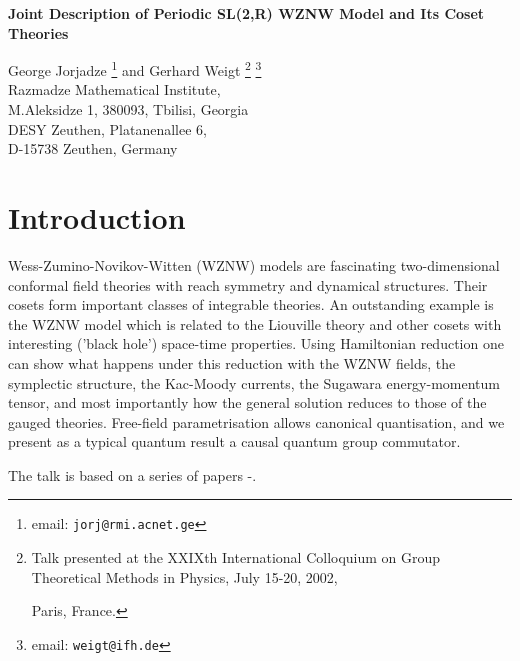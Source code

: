 \documentclass[a4paper,12]{article}
\renewcommand{\title}[1]{\begin{center}\bf\Large #1\end{center}}
\renewcommand{\author}[1]{\begin{center}\large #1\end{center}}
\begin{document}
\title{Joint Description of Periodic SL(2,R) WZNW Model and Its
  Coset Theories}

\author{
 George Jorjadze\coordHE{} 
\footnote{email: \tt jorj@rmi.acnet.ge}
 and Gerhard Weigt\myHighlight{${}^b$}\coordHE{}  
\footnote{Talk presented at the XXIXth International 
Colloquium on Group Theoretical Methods in Physics, July 15-20, 2002, 

\hspace{1.8mm}
Paris, France.}
\footnote{email: \tt weigt@ifh.de} \\
{\small\myHighlight{${}^a$}\coordHE{}Razmadze Mathematical Institute,}\\
  {\small M.Aleksidze 1, 380093, Tbilisi, Georgia}\\
{\small\myHighlight{${}^b$}\coordHE{}DESY Zeuthen, Platanenallee 6,}\\
{\small D-15738 Zeuthen, Germany}}

\begin{abstract}

\noindent
Liouville, \coordHE{} and \coordHE{}
coset structures are completely described by gauge invariant
Hamiltonian reduction of the  \coordHE{} WZNW theory.
\end{abstract}

\section{Introduction}

Wess-Zumino-Novikov-Witten (WZNW) models are fascinating
two-dimensional conformal field theories with reach symmetry and
dynamical structures. Their cosets form important classes of
integrable theories. An outstanding example is the \coordHE{} WZNW
model which is related to the Liouville theory and other cosets
with interesting ('black hole') space-time properties. Using
Hamiltonian reduction one can show what happens under this reduction
with the \coordHE{} WZNW fields, the symplectic structure, the
Kac-Moody currents, the Sugawara energy-momentum tensor, and most
importantly how the general \coordHE{} solution reduces to those of the
gauged theories. Free-field parametrisation allows canonical
quantisation, and we present as a typical quantum result a causal
quantum group commutator.

The talk is based on a series of papers \cite{OW}-\cite{FJW2}.
\end{document}
